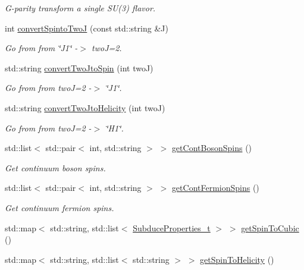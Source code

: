 \begin{DoxyCompactItemize}
\begin{DoxyCompactList}\small\item\em G-\/parity transform a single S\+U(3) flavor. \end{DoxyCompactList}\item 
int \mbox{\hyperlink{namespaceHadron_acca1db731e7341c6fce2d78c3442c739}{convert\+Spinto\+TwoJ}} (const std\+::string \&J)
\begin{DoxyCompactList}\small\item\em Go from from \char`\"{}\+J1\char`\"{} -\/$>$ twoJ=2. \end{DoxyCompactList}\item 
std\+::string \mbox{\hyperlink{namespaceHadron_a8593942e8f0063aaf40c4593dbb2cdbe}{convert\+Two\+Jto\+Spin}} (int twoJ)
\begin{DoxyCompactList}\small\item\em Go from from twoJ=2 -\/$>$ \char`\"{}\+J1\char`\"{}. \end{DoxyCompactList}\item 
std\+::string \mbox{\hyperlink{namespaceHadron_a354d39c9f601a0a0f19857eb4b79a2d2}{convert\+Two\+Jto\+Helicity}} (int twoJ)
\begin{DoxyCompactList}\small\item\em Go from from twoJ=2 -\/$>$ \char`\"{}\+H1\char`\"{}. \end{DoxyCompactList}\item 
std\+::list$<$ std\+::pair$<$ int, std\+::string $>$ $>$ \mbox{\hyperlink{namespaceHadron_a758e677215948a2af60fc6fee269d410}{get\+Cont\+Boson\+Spins}} ()
\begin{DoxyCompactList}\small\item\em Get continuum boson spins. \end{DoxyCompactList}\item 
std\+::list$<$ std\+::pair$<$ int, std\+::string $>$ $>$ \mbox{\hyperlink{namespaceHadron_a7131ce7dd50310f2beeabb2a83dde484}{get\+Cont\+Fermion\+Spins}} ()
\begin{DoxyCompactList}\small\item\em Get continuum fermion spins. \end{DoxyCompactList}\item 
std\+::map$<$ std\+::string, std\+::list$<$ \mbox{\hyperlink{structHadron_1_1SubduceProperties__t}{Subduce\+Properties\+\_\+t}} $>$ $>$ \mbox{\hyperlink{namespaceHadron_a0ad570b7ce2fbc8f215d0a5ee08afdb2}{get\+Spin\+To\+Cubic}} ()
\item 
std\+::map$<$ std\+::string, std\+::list$<$ std\+::string $>$ $>$ \mbox{\hyperlink{namespaceHadron_a65015bc93f8b83c79f094361b407ed28}{get\+Spin\+To\+Helicity}} ()

\end{DoxyCompactItemize}
